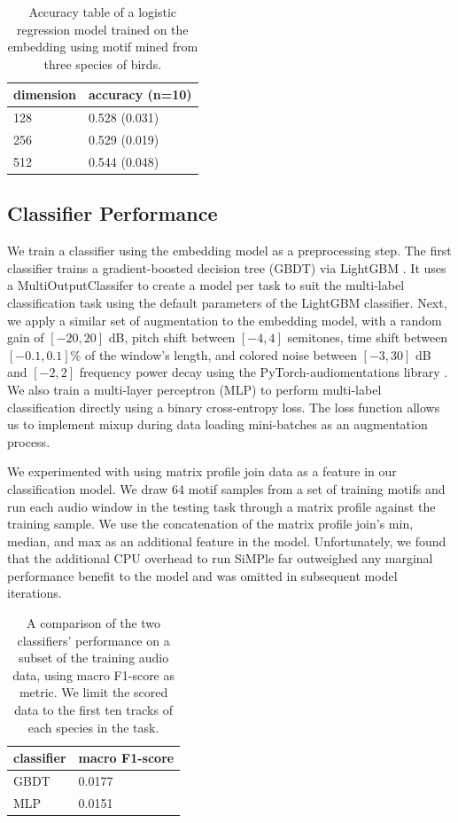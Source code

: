 \documentclass[
]{ceurart}
\begin{document}
\begin{table}[h]
\begin{tabular}{|l|l|}
\hline
dimension & accuracy (n=10) \\ \hline
128       & 0.528 (0.031)   \\ \hline
256       & 0.529 (0.019)   \\ \hline
512       & 0.544 (0.048)   \\ \hline
\end{tabular}
\caption{Accuracy table of a logistic regression model trained on the embedding using motif mined from three species of birds. }
\label{tab:emb-acc}
\end{table}

\subsection{Classifier Performance}

We train a classifier using the embedding model as a preprocessing step. The first classifier trains a gradient-boosted decision tree (GBDT) via LightGBM \cite{ke2017lightgbm}. It uses a MultiOutputClassifer to create a model per task to suit the multi-label classification task using the default parameters of the LightGBM classifier. Next, we apply a similar set of augmentation to the embedding model, with a random gain of $[-20, 20]$ dB, pitch shift between $[-4, 4]$ semitones, time shift between $[-0.1, 0.1]\%$ of the window's length, and colored noise between $[-3, 30]$ dB and $[-2, 2]$ frequency power decay using the PyTorch-audiomentations library \cite{pytorch-audiomentations}. We also train a multi-layer perceptron (MLP) to perform multi-label classification directly using a binary cross-entropy loss. The loss function allows us to implement mixup \cite{zhang2017mixup} during data loading mini-batches as an augmentation process.

We experimented with using matrix profile join data as a feature in our classification model. We draw 64 motif samples from a set of training motifs and run each audio window in the testing task through a matrix profile against the training sample. We use the concatenation of the matrix profile join's min, median, and max as an additional feature in the model. Unfortunately, we found that the additional CPU overhead to run SiMPle far outweighed any marginal performance benefit to the model and was omitted in subsequent model iterations.

\begin{table}[h]
\begin{tabular}{|l|l|}
\hline
classifier     & macro F1-score \\ \hline
GBDT           & 0.0177         \\ \hline
MLP            & 0.0151         \\ \hline
\end{tabular}
\caption{A comparison of the two classifiers' performance on a subset of the training audio data, using macro F1-score as metric. We limit the scored data to the first ten tracks of each species in the task.}
\label{tab:f1-score}
\end{table}
\end{document}
